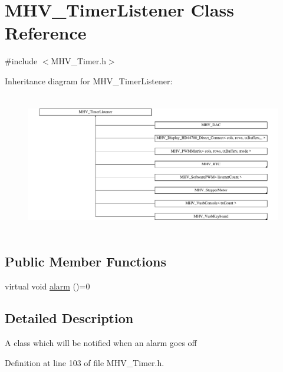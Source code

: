 \hypertarget{class_m_h_v___timer_listener}{\section{M\-H\-V\-\_\-\-Timer\-Listener Class Reference}
\label{class_m_h_v___timer_listener}
}


{\ttfamily \#include $<$M\-H\-V\-\_\-\-Timer.\-h$>$}

Inheritance diagram for M\-H\-V\-\_\-\-Timer\-Listener\-:\begin{figure}[H]
\begin{center}
\leavevmode
\includegraphics[height=6.191646cm]{class_m_h_v___timer_listener}
\end{center}
\end{figure}
\subsection*{Public Member Functions}
\begin{DoxyCompactItemize}
\item 
virtual void \hyperlink{class_m_h_v___timer_listener_a27e243f8df77035eca626beab5b3e60a}{alarm} ()=0
\end{DoxyCompactItemize}


\subsection{Detailed Description}
A class which will be notified when an alarm goes off 

Definition at line 103 of file M\-H\-V\-\_\-\-Timer.\-h.



